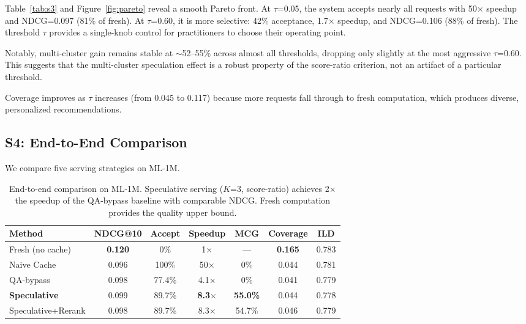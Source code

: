 \documentclass{article}
\begin{document}
Table~\ref{tab:s3} and Figure~\ref{fig:pareto} reveal a smooth Pareto front. At $\tau$=0.05, the system accepts nearly all requests with 50$\times$ speedup and NDCG=0.097 (81\% of fresh). At $\tau$=0.60, it is more selective: 42\% acceptance, 1.7$\times$ speedup, and NDCG=0.106 (88\% of fresh). The threshold $\tau$ provides a single-knob control for practitioners to choose their operating point.

Notably, multi-cluster gain remains stable at $\sim$52--55\% across almost all thresholds, dropping only slightly at the most aggressive $\tau$=0.60. This suggests that the multi-cluster speculation effect is a robust property of the score-ratio criterion, not an artifact of a particular threshold.

Coverage improves as $\tau$ increases (from 0.045 to 0.117) because more requests fall through to fresh computation, which produces diverse, personalized recommendations.

\subsection{S4: End-to-End Comparison}
\label{sec:exp_s4}

We compare five serving strategies on ML-1M.

\begin{table}[t]
\centering
\caption{End-to-end comparison on ML-1M. Speculative serving ($K$=3, score-ratio) achieves 2$\times$ the speedup of the QA-bypass baseline with comparable NDCG. Fresh computation provides the quality upper bound.}
\label{tab:s4}
\small
\begin{tabular}{lcccccc}
\toprule
\textbf{Method} & \textbf{NDCG@10} & \textbf{Accept} & \textbf{Speedup} & \textbf{MCG} & \textbf{Coverage} & \textbf{ILD} \\
\midrule
Fresh (no cache) & \textbf{0.120} & 0\% & 1$\times$ & --- & \textbf{0.165} & 0.783 \\
Naive Cache & 0.096 & 100\% & 50$\times$ & 0\% & 0.044 & 0.781 \\
QA-bypass & 0.098 & 77.4\% & 4.1$\times$ & 0\% & 0.041 & 0.779 \\
\textbf{Speculative} & 0.099 & 89.7\% & \textbf{8.3$\times$} & \textbf{55.0\%} & 0.044 & 0.778 \\
Speculative+Rerank & 0.098 & 89.7\% & 8.3$\times$ & 54.7\% & 0.046 & 0.779 \\
\bottomrule
\end{tabular}
\end{table}
\end{document}
